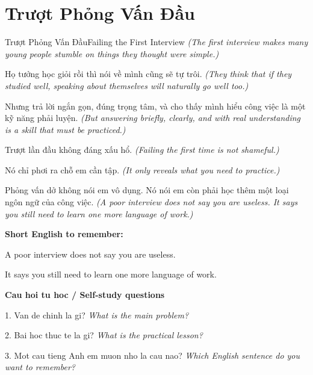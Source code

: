 \section{Trượt Phỏng Vấn Đầu}
\begin{truyen}{Trượt Phỏng Vấn Đầu}{Failing the First Interview}
\textit{(The first interview makes many young people stumble on things they thought were simple.)}

Họ tưởng học giỏi rồi thì nói về mình cũng sẽ tự trôi.
\textit{(They think that if they studied well, speaking about themselves will naturally go well too.)}

Nhưng trả lời ngắn gọn, đúng trọng tâm, và cho thấy mình hiểu công việc là một kỹ năng phải luyện.
\textit{(But answering briefly, clearly, and with real understanding is a skill that must be practiced.)}

Trượt lần đầu không đáng xấu hổ.
\textit{(Failing the first time is not shameful.)}

Nó chỉ phơi ra chỗ em cần tập.
\textit{(It only reveals what you need to practice.)}

\end{truyen}

\begin{baihoc}
Phỏng vấn dở không nói em vô dụng. Nó nói em còn phải học thêm một loại ngôn ngữ của công việc.
\textit{(A poor interview does not say you are useless. It says you still need to learn one more language of work.)}
\end{baihoc}

\begin{ghinhoanh}
\textbf{Short English to remember:}

A poor interview does not say you are useless.

It says you still need to learn one more language of work.

\end{ghinhoanh}

\begin{tuhocnhanh}
\textbf{Cau hoi tu hoc / Self-study questions}

1. Van de chinh la gi? \textit{What is the main problem?}

2. Bai hoc thuc te la gi? \textit{What is the practical lesson?}

3. Mot cau tieng Anh em muon nho la cau nao? \textit{Which English sentence do you want to remember?}
\end{tuhocnhanh}
\ngancach

